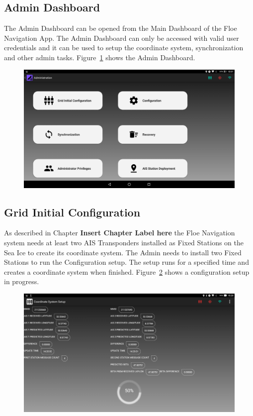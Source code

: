 \subsection{Admin Dashboard}
\label{subsec:subsec7_2_1}
\noindent
The Admin Dashboard can be opened from the Main Dashboard of the Floe Navigation App. The Admin Dashboard can only be accessed with valid user credentials and it can be used to setup the coordinate system, synchronization and other admin tasks. Figure~\ref{fig:CH7AdminMenu} shows the Admin Dashboard.
\begin{figure}[h]
	\centering
	\includegraphics[height=0.3\textheight]{fig07/AdminMenu.png}
	\label{fig:CH7AdminMenu}
\end{figure}
%
\newpage
\subsection{Grid Initial Configuration}
\label{subsec:subsec7_2_2}
\noindent
As described in Chapter \textbf{Insert Chapter Label here} the Floe Navigation system needs at least two AIS Transponders installed as Fixed Stations on the Sea Ice to create its coordinate system. The Admin needs to install two Fixed Stations to run the Configuration setup. The setup runs for a specified time and creates a coordinate system when finished. Figure~\ref{fig:CH7SetupScreen} shows a configuration setup in progress. 
\begin{figure}[h]
	\centering
	\includegraphics[height=0.3\textheight]{fig07/SetupScreen.png}
	\label{fig:CH7SetupScreen}
\end{figure}
%
